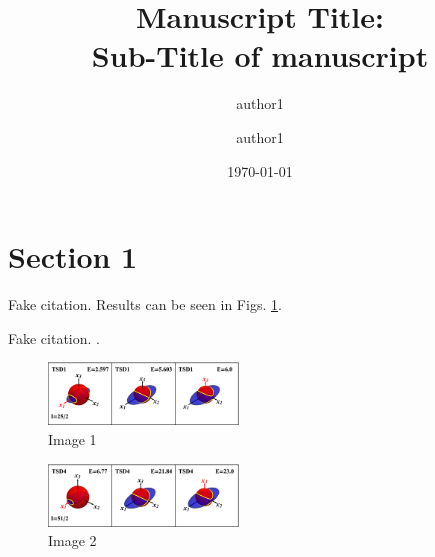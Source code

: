 \documentclass[%
 reprint,
 amsmath,
 amssymb,
 aps,
]{revtex4-2}
\begin{document}
\title{Manuscript Title:\\Sub-Title of manuscript }%

\author{author1}%
\author{author1}%
%


\date{\today}

\begin{abstract}
\lipsum[1]
\end{abstract}

\maketitle


\section{Section 1}

\lipsum[1-2] Fake citation. Results can be seen in Figs. \ref{fig:image-1}.

\lipsum[1] Fake citation. \cite{feyn54}.


\begin{figure}
    \centering
    \includegraphics[width=0.45\textwidth]{images/energy_ellipsoids/tsd1_spin1.eps}
    \caption{Image 1}
    \label{fig:image-1}
\end{figure}


\begin{figure}
    \centering
    \includegraphics[width=0.45\textwidth]{images/energy_ellipsoids/tsd4_spin2.eps}
    \caption{Image 2}
    \label{fig:image-2}
\end{figure}


\end{document}

